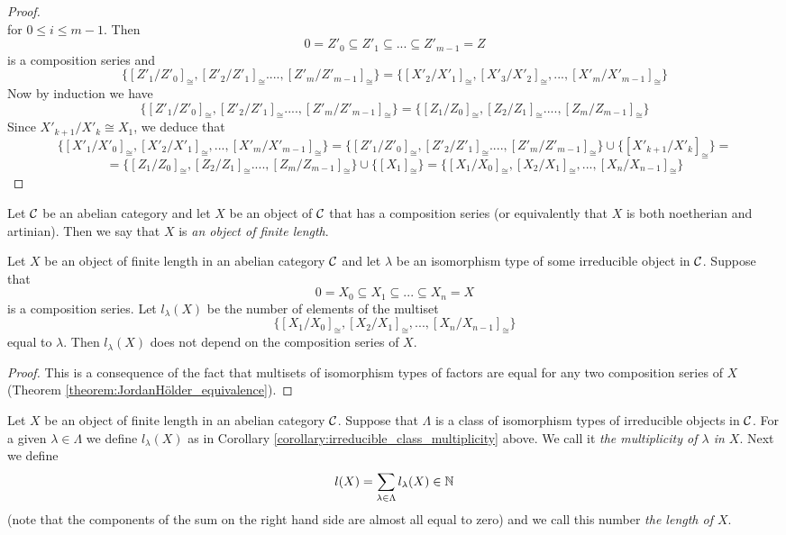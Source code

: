 \begin{proof}
$$$$
for $0\leq i\leq m-1$. Then
$$0 = Z'_0 \subseteq Z'_1\subseteq ...\subseteq Z'_{m-1}=Z$$
is a composition series and
$$\{[Z'_1/Z'_0]_{\cong},[Z'_2/Z'_1]_{\cong}....,[Z'_m/Z'_{m-1}]_{\cong}\} = \{[X'_2/X'_1]_{\cong},[X'_3/X'_2]_{\cong},...,[X'_m/X'_{m-1}]_{\cong}\}$$
Now by induction we have
$$\{[Z'_1/Z'_0]_{\cong},[Z'_2/Z'_1]_{\cong}....,[Z'_m/Z'_{m-1}]_{\cong}\} = \{[Z_1/Z_0]_{\cong},[Z_2/Z_1]_{\cong}....,[Z_m/Z_{m-1}]_{\cong}\}$$
Since $X'_{k+1}/X'_k \cong X_1$, we deduce that
$$\{[X'_1/X'_0]_{\cong},[X'_2/X'_1]_{\cong},...,[X'_m/X'_{m-1}]_{\cong}\} = \{[Z'_1/Z'_0]_{\cong},[Z'_2/Z'_1]_{\cong}....,[Z'_m/Z'_{m-1}]_{\cong}\}\cup \{[X'_{k+1}/X'_k]_{\cong}\} =$$
$$=\{[Z_1/Z_0]_{\cong},[Z_2/Z_1]_{\cong}....,[Z_m/Z_{m-1}]_{\cong}\}\cup  \{[X_1]_{\cong}\} = \{[X_1/X_0]_{\cong},[X_2/X_1]_{\cong},...,[X_n/X_{n-1}]_{\cong}\}$$
\end{proof}


\begin{definition}
Let ${\mathcal C}$ be an abelian category and let $X$ be an object of ${\mathcal C}$ that has a composition series (or equivalently that $X$ is both noetherian and artinian). Then we say that $X$ is \textit{an object of finite length}.
\end{definition}

\begin{corollary}\label{corollary:irreducible_class_multiplicity}
Let $X$ be an object of finite length in an abelian category ${\mathcal C}$ and let $\lambda$ be an isomorphism type of some irreducible object in ${\mathcal C}$. Suppose that
$$0=X_0 \subseteq X_1\subseteq ...\subseteq X_n = X$$
is a composition series. Let $l_{\lambda}(X)$ be the number of elements of the multiset
$$\{[X_1/X_0]_{\cong},[X_2/X_1]_{\cong},...,[X_n/X_{n-1}]_{\cong}\}$$
equal to $\lambda$. Then $l_{\lambda}(X)$ does not depend on the composition series of $X$.
\end{corollary}
\begin{proof}
This is a consequence of the fact that multisets of isomorphism types of factors are equal for any two composition series of $X$ (Theorem \ref{theorem:JordanHölder_equivalence}).
\end{proof}

\begin{definition}
Let $X$ be an object of finite length in an abelian category ${\mathcal C}$. Suppose that $\Lambda$ is a class of isomorphism types of irreducible objects in ${\mathcal C}$. For a given $\lambda \in \Lambda$ we define $l_{\lambda}(X)$ as in Corollary \ref{corollary:irreducible_class_multiplicity} above. We call it \textit{the multiplicity of $\lambda$ in $X$}. Next we define
$$l(X) = \sum_{\lambda\in \Lambda}l_{\lambda}(X)\in {\mathbb N}$$
(note that the components of the sum on the right hand side are almost all equal to zero) and we call this number \textit{the length of $X$}.
\end{definition}

